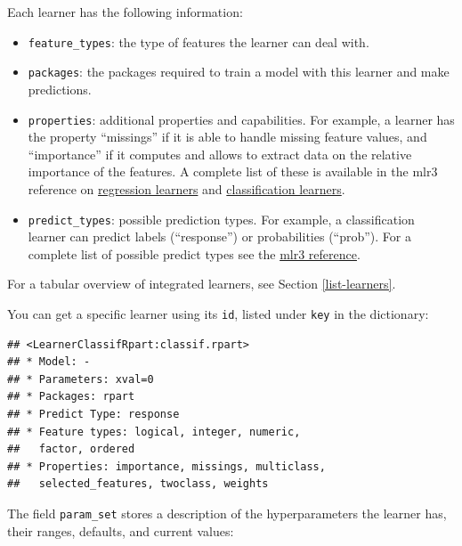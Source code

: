 \documentclass[]{article}
\newenvironment{Shaded}{\begin{snugshade}}{\end{snugshade}}
\newcommand{\KeywordTok}[1]{\textcolor[rgb]{0.13,0.29,0.53}{\textbf{#1}}}
\newcommand{\NormalTok}[1]{#1}
\newcommand{\OperatorTok}[1]{\textcolor[rgb]{0.81,0.36,0.00}{\textbf{#1}}}
\newcommand{\StringTok}[1]{\textcolor[rgb]{0.31,0.60,0.02}{#1}}
\providecommand{\tightlist}{%
  \setlength{\itemsep}{0pt}\setlength{\parskip}{0pt}}
\renewenvironment{Shaded} {\begin{snugshade}\small} {\end{snugshade}}
\begin{document}
Each learner has the following information:

\begin{itemize}
\tightlist
\item
  \texttt{feature\_types}: the type of features the learner can deal with.
\item
  \texttt{packages}: the packages required to train a model with this learner and make predictions.
\item
  \texttt{properties}: additional properties and capabilities.
  For example, a learner has the property ``missings'' if it is able to handle missing feature values, and ``importance'' if it computes and allows to extract data on the relative importance of the features.
  A complete list of these is available in the mlr3 reference on \href{https://mlr3.mlr-org.com/reference/LearnerRegr.html\#construction}{regression learners} and \href{https://mlr3.mlr-org.com/reference/LearnerClassif.html\#construction}{classification learners}.
\item
  \texttt{predict\_types}: possible prediction types. For example, a classification learner can predict labels (``response'') or probabilities (``prob''). For a complete list of possible predict types see the \href{https://mlr3.mlr-org.com/reference/Learner.html\#construction}{mlr3 reference}.
\end{itemize}

For a tabular overview of integrated learners, see Section \ref{list-learners}.

You can get a specific learner using its \texttt{id}, listed under \texttt{key} in the dictionary:

\begin{Shaded}
\end{Shaded}

\begin{verbatim}
## <LearnerClassifRpart:classif.rpart>
## * Model: -
## * Parameters: xval=0
## * Packages: rpart
## * Predict Type: response
## * Feature types: logical, integer, numeric,
##   factor, ordered
## * Properties: importance, missings, multiclass,
##   selected_features, twoclass, weights
\end{verbatim}

The field \texttt{param\_set} stores a description of the hyperparameters the learner has, their ranges, defaults, and current values:
\end{document}
